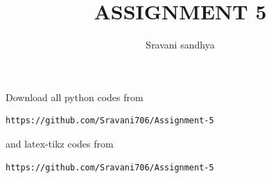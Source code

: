 \documentclass[journal,12pt,twocolumn]{IEEEtran}
\begin{document}
%


\newtheorem{theorem}{Theorem}[section]
\newtheorem{problem}{Problem}
\newtheorem{proposition}{Proposition}[section]
\newtheorem{lemma}{Lemma}[section]
\newtheorem{corollary}[theorem]{Corollary}
\newtheorem{example}{Example}[section]
\newtheorem{definition}[problem]{Definition}
\newcommand{\BEQA}{\begin{eqnarray}}
\newcommand{\EEQA}{\end{eqnarray}}
\newcommand{\define}{\stackrel{\triangle}{=}}

\providecommand{\mbf}{\mathbf}
\providecommand{\pr}[1]{\ensuremath{\Pr\left(#1\right)}}
\providecommand{\qfunc}[1]{\ensuremath{Q\left(#1\right)}}
\providecommand{\sbrak}[1]{\ensuremath{{}\left[#1\right]}}
\providecommand{\lsbrak}[1]{\ensuremath{{}\left[#1\right.}}
\providecommand{\rsbrak}[1]{\ensuremath{{}\left.#1\right]}}
\providecommand{\brak}[1]{\ensuremath{\left(#1\right)}}
\providecommand{\lbrak}[1]{\ensuremath{\left(#1\right.}}
\providecommand{\rbrak}[1]{\ensuremath{\left.#1\right)}}
\providecommand{\cbrak}[1]{\ensuremath{\left\{#1\right\}}}
\providecommand{\lcbrak}[1]{\ensuremath{\left\{#1\right.}}
\providecommand{\rcbrak}[1]{\ensuremath{\left.#1\right\}}}
\theoremstyle{remark}
\newtheorem{rem}{Remark}
\newcommand{\sgn}{\mathop{\mathrm{sgn}}}
\providecommand{\abs}[1]{\left\vert#1\right\vert}
\providecommand{\res}[1]{\Res\displaylimits_{#1}} 
\providecommand{\norm}[1]{\left\lVert#1\right\rVert}
\providecommand{\mtx}[1]{\mathbf{#1}}
\providecommand{\mean}[1]{E\left[ #1 \right]}
\providecommand{\fourier}{\overset{\mathcal{F}}{ \rightleftharpoons}}
\providecommand{\system}{\overset{\mathcal{H}}{ \longleftrightarrow}}


\newcommand{\myvec}[1]{\ensuremath{\begin{pmatrix}#1\end{pmatrix}}}
\newcommand{\cmyvec}[1]{\ensuremath{\begin{pmatrix*}[c]#1\end{pmatrix*}}}
\newcommand{\mydet}[1]{\ensuremath{\begin{vmatrix}#1\end{vmatrix}}}
\newcommand{\proj}[2]{\textbf{proj}_{\vec{#1}}\vec{#2}}
\let\StandardTheFigure\thefigure
\let\vec\mathbf
\title{
ASSIGNMENT 5
}
\author{Sravani sandhya}
	

\maketitle
\renewcommand{\thefigure}{\theenumi}
\renewcommand{\thetable}{\theenumi}
  Download all python codes from 
\begin{lstlisting}
https://github.com/Sravani706/Assignment-5
\end{lstlisting}
%
and latex-tikz codes from 
%
\begin{lstlisting}
https://github.com/Sravani706/Assignment-5
\end{lstlisting}
%
\end{document}
